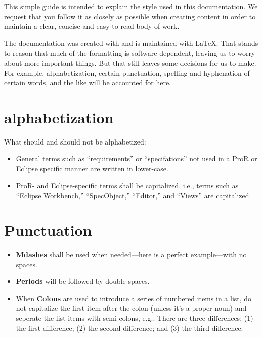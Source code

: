 This simple guide is intended to explain the style used in this documentation.  We request that you follow it as closely as possible when creating content in order to maintain a clear, concise and easy to read body of work.

The documentation was created with and is maintained with \LaTeX.  That stands to reason that much of the formatting is software-dependent, leaving us to worry about more important things.  But that still leaves some decisions for us to make.  For example, alphabetization, certain punctuation, spelling and hyphenation of certain words, and the like will be accounted for here.


\section{alphabetization}

What should and should not be alphabetized:

\begin{itemize}

\item
  General terms such as ``requirements'' or ``specifations'' not used in a ProR or Eclipse specific manner are written in lower-case.
\item
  ProR- and Eclipse-specific terms shall be capitalized.  i.e., terms such as ``Eclipse Workbench,'' ``SpecObject,'' ``Editor,'' and ``Views'' are capitalized.

\end{itemize}

\section{Punctuation}

\begin{itemize}

\item
  \textbf{Mdashes} shall be used when needed—here is a perfect example—with no spaces.  
\item
  \textbf{Periods} will be followed by double-spaces.
\item
  When \textbf{Colons} are used to introduce a series of numbered items in a list, do not capitalize the first item after the colon (unless it's a proper noun) and seperate the list items with semi-colons, e.g.:
  There are three differences: (1) the first difference; (2) the second difference; and (3) the third difference.
  
\end{itemize}

